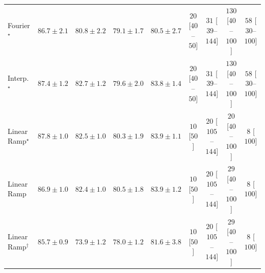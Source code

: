 \begin{tabular}{l|cccc|cccc|}
Fourier$^\star$ & {\cellcolor[HTML]{00502D}} \color[HTML]{F1F1F1} $86.7\pm 2.1$ & {\cellcolor[HTML]{167A3F}} \color[HTML]{F1F1F1} $80.8\pm 2.2$ & {\cellcolor[HTML]{238443}} \color[HTML]{F1F1F1} $79.1\pm 1.7$ & {\cellcolor[HTML]{187B3F}} \color[HTML]{F1F1F1} $80.5\pm 2.7$ & {\cellcolor[HTML]{FFF4F0}} \color[HTML]{000000} $20$ [$40$--$50$] & {\cellcolor[HTML]{FFF2EE}} \color[HTML]{000000} $31$ [$39$--$144$] & {\cellcolor[HTML]{FDDBD7}} \color[HTML]{000000} $130$ [$40$--$100$] & {\cellcolor[HTML]{FEECE9}} \color[HTML]{000000} $58$ [$30$--$100$] \\
Interp.$^\star$ & {\cellcolor[HTML]{004A2B}} \color[HTML]{F1F1F1} $87.4\pm 1.2$ & {\cellcolor[HTML]{076D39}} \color[HTML]{F1F1F1} $82.7\pm 1.2$ & {\cellcolor[HTML]{208242}} \color[HTML]{F1F1F1} $79.6\pm 2.0$ & {\cellcolor[HTML]{006636}} \color[HTML]{F1F1F1} $83.8\pm 1.4$ & {\cellcolor[HTML]{FFF4F0}} \color[HTML]{000000} $20$ [$40$--$50$] & {\cellcolor[HTML]{FFF2EE}} \color[HTML]{000000} $31$ [$39$--$144$] & {\cellcolor[HTML]{FDDBD7}} \color[HTML]{000000} $130$ [$40$--$100$] & {\cellcolor[HTML]{FEECE9}} \color[HTML]{000000} $58$ [$30$--$100$] \\
Linear Ramp$^\star$ & {\cellcolor[HTML]{00472A}} \color[HTML]{F1F1F1} $87.8\pm 1.0$ & {\cellcolor[HTML]{096F3A}} \color[HTML]{F1F1F1} $82.5\pm 1.0$ & {\cellcolor[HTML]{1A7D40}} \color[HTML]{F1F1F1} $80.3\pm 1.9$ & {\cellcolor[HTML]{006636}} \color[HTML]{F1F1F1} $83.9\pm 1.1$ & {\cellcolor[HTML]{FFF7F3}} \color[HTML]{000000} $10$ [$50$] & {\cellcolor[HTML]{FFF4F0}} \color[HTML]{000000} $20$ [$105$--$144$] & {\cellcolor[HTML]{FFF4F0}} \color[HTML]{000000} $20$ [$40$--$100$] & {\cellcolor[HTML]{FFF7F3}} \color[HTML]{000000} $8$ [$100$] \\
Linear Ramp & {\cellcolor[HTML]{004E2D}} \color[HTML]{F1F1F1} $86.9\pm 1.0$ & {\cellcolor[HTML]{096F3A}} \color[HTML]{F1F1F1} $82.4\pm 1.0$ & {\cellcolor[HTML]{187B3F}} \color[HTML]{F1F1F1} $80.5\pm 1.8$ & {\cellcolor[HTML]{006636}} \color[HTML]{F1F1F1} $83.9\pm 1.2$ & {\cellcolor[HTML]{FFF7F3}} \color[HTML]{000000} $10$ [$50$] & {\cellcolor[HTML]{FFF4F0}} \color[HTML]{000000} $20$ [$105$--$144$] & {\cellcolor[HTML]{FFF3EF}} \color[HTML]{000000} $29$ [$40$--$100$] & {\cellcolor[HTML]{FFF7F3}} \color[HTML]{000000} $8$ [$100$] \\
Linear Ramp$^\dagger$ & {\cellcolor[HTML]{005830}} \color[HTML]{F1F1F1} $85.7\pm 0.9$ & {\cellcolor[HTML]{4CB063}} \color[HTML]{F1F1F1} $73.9\pm 1.2$ & {\cellcolor[HTML]{2B8E4A}} \color[HTML]{F1F1F1} $78.0\pm 1.2$ & {\cellcolor[HTML]{10743C}} \color[HTML]{F1F1F1} $81.6\pm 3.8$ & {\cellcolor[HTML]{FFF7F3}} \color[HTML]{000000} $10$ [$50$] & {\cellcolor[HTML]{FFF4F0}} \color[HTML]{000000} $20$ [$105$--$144$] & {\cellcolor[HTML]{FFF3EF}} \color[HTML]{000000} $29$ [$40$--$100$] & {\cellcolor[HTML]{FFF7F3}} \color[HTML]{000000} $8$ [$100$] \\

\end{tabular}
